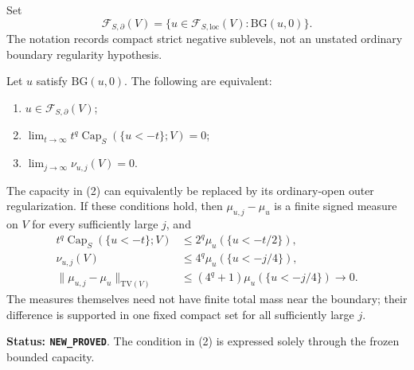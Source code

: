 \begin{definition}
\label{def:r11-no-loss-boundary-class}
Set
\[
 \mathcal F_{S,\partial}(V)
   =\{u\in\mathcal F_{S,\mathrm{loc}}(V):
                                      \mathrm{BG}(u,0)\}.
 \tag{BC3}
\]
The notation records compact strict negative sublevels, not an
unstated ordinary boundary regularity hypothesis.
\end{definition}

\begin{theorem}
\label{thm:r11-capacity-tail-criterion}
Let $u$ satisfy $\mathrm{BG}(u,0)$. The following are equivalent:
\begin{enumerate}
\item $u\in\mathcal F_{S,\partial}(V)$;
\item $\displaystyle\lim_{t\to\infty}
              t^q\operatorname{Cap}_S(\{u<-t\};V)=0$;
\item $\displaystyle\lim_{j\to\infty}\nu_{u,j}(V)=0$.
\end{enumerate}
The capacity in (2) can equivalently be replaced by its ordinary-open
outer regularization. If these conditions hold, then
$\mu_{u,j}-\mu_u$ is a finite signed measure on $V$ for every
sufficiently large $j$, and
\[
 \begin{split}
 t^q\operatorname{Cap}_S(\{u<-t\};V)
       &\leq2^q\mu_u(\{u<-t/2\}),\\
 \nu_{u,j}(V)&\leq4^q\mu_u(\{u<-j/4\}),\\
 \|\mu_{u,j}-\mu_u\|_{\mathrm{TV}(V)}
       &\leq(4^q+1)\mu_u(\{u<-j/4\})\longrightarrow0.
 \end{split}
 \tag{BC4}
\]
The measures themselves need not have finite total mass near the
boundary; their difference is supported in one fixed compact set
for all sufficiently large $j$.
\end{theorem}

\noindent\textbf{Status: \texttt{NEW\_PROVED}}. The condition in
(2) is expressed solely through the frozen bounded capacity.

